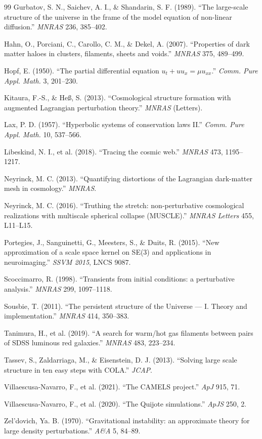 \documentclass[11pt]{article}
\begin{document}
\begin{thebibliography}{99}
 Gurbatov, S. N., Saichev, A. I., \& Shandarin, S. F. (1989). ``The large-scale structure of the universe in the frame of the model equation of non-linear diffusion.'' \emph{MNRAS} 236, 385--402.

 Hahn, O., Porciani, C., Carollo, C. M., \& Dekel, A. (2007). ``Properties of dark matter haloes in clusters, filaments, sheets and voids.'' \emph{MNRAS} 375, 489--499.

 Hopf, E. (1950). ``The partial differential equation $u_t + u u_x = \mu u_{xx}$.'' \emph{Comm. Pure Appl. Math.} 3, 201--230.

 Kitaura, F.-S., \& He\ss{}, S. (2013). ``Cosmological structure formation with augmented Lagrangian perturbation theory.'' \emph{MNRAS} (Letters).

 Lax, P. D. (1957). ``Hyperbolic systems of conservation laws II.'' \emph{Comm. Pure Appl. Math.} 10, 537--566.

 Libeskind, N. I., et al. (2018). ``Tracing the cosmic web.'' \emph{MNRAS} 473, 1195--1217.

 Neyrinck, M. C. (2013). ``Quantifying distortions of the Lagrangian dark-matter mesh in cosmology.'' \emph{MNRAS}.

 Neyrinck, M. C. (2016). ``Truthing the stretch: non-perturbative cosmological realizations with multiscale spherical collapse (MUSCLE).'' \emph{MNRAS Letters} 455, L11--L15.

 Portegies, J., Sanguinetti, G., Meesters, S., \& Duits, R. (2015). ``New approximation of a scale space kernel on SE(3) and applications in neuroimaging.'' \emph{SSVM 2015}, LNCS 9087.

 Scoccimarro, R. (1998). ``Transients from initial conditions: a perturbative analysis.'' \emph{MNRAS} 299, 1097--1118.

 Sousbie, T. (2011). ``The persistent structure of the Universe --- I. Theory and implementation.'' \emph{MNRAS} 414, 350--383.

 Tanimura, H., et al. (2019). ``A search for warm/hot gas filaments between pairs of SDSS luminous red galaxies.'' \emph{MNRAS} 483, 223--234.

 Tassev, S., Zaldarriaga, M., \& Eisenstein, D. J. (2013). ``Solving large scale structure in ten easy steps with COLA.'' \emph{JCAP}.

 Villaescusa-Navarro, F., et al. (2021). ``The CAMELS project.'' \emph{ApJ} 915, 71.

 Villaescusa-Navarro, F., et al. (2020). ``The Quijote simulations.'' \emph{ApJS} 250, 2.

 Zel'dovich, Ya. B. (1970). ``Gravitational instability: an approximate theory for large density perturbations.'' \emph{A\&A} 5, 84--89.

\end{thebibliography}
\end{document}
